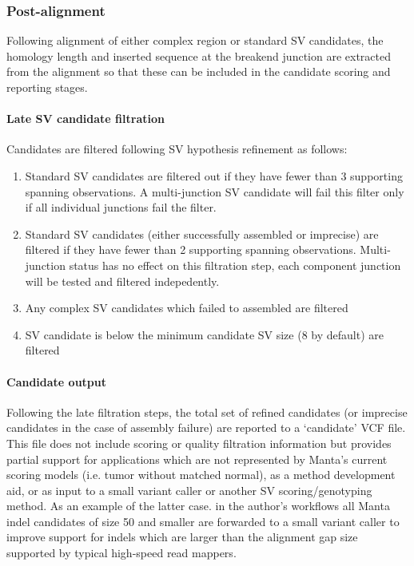 \documentclass{article}
\begin{document}
\subsubsection{Post-alignment}
Following alignment of either complex region or standard SV candidates, the homology length and inserted sequence at the breakend junction are extracted from the alignment so that these can be included in the candidate scoring and reporting stages.

\paragraph{Late SV candidate filtration}

Candidates are filtered following SV hypothesis refinement as follows:

\begin{enumerate}
    \item Standard SV candidates are filtered out if they have fewer than 3 supporting spanning observations. A multi-junction SV candidate will fail this filter only if all individual junctions fail the filter.
    \item Standard SV candidates (either successfully assembled or imprecise) are filtered if they have fewer than 2 supporting spanning observations. Multi-junction status has no effect on this filtration step, each component junction will be tested and filtered indepedently.
    \item Any complex SV candidates which failed to assembled are filtered
    \item SV candidate is below the minimum candidate SV size (8 by default) are filtered
\end{enumerate}

\paragraph{Candidate output}

Following the late filtration steps, the total set of refined candidates (or imprecise candidates in the case of assembly failure) are reported to a `candidate' VCF file. This file does not include scoring or quality filtration information but provides partial support for applications which are not represented by Manta's current scoring models (i.e. tumor without matched normal), as a method development aid, or as input to a small variant caller or another SV scoring/genotyping method. As an example of the latter case. in the author's workflows all Manta indel candidates of size 50 and smaller are forwarded to a small variant caller to improve support for indels which are larger than the alignment gap size supported by typical high-speed read mappers.
\end{document}
